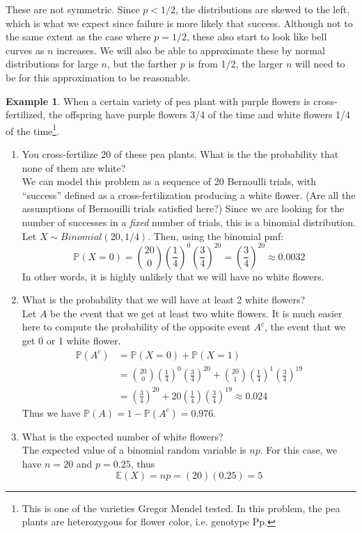 \documentclass[12pt]{article}
\theoremstyle{definition}
\newtheorem*{example}{Example}
\theoremstyle{remark}
\def\P{{\mathbb P}}
\def\E{{\mathbb E}}
\begin{document}
These are not symmetric. Since $p < 1/2$, the distributions are skewed to the left, which is what we expect since failure is more likely that success. Although not to the same extent as the case where $p = 1/2$, these also start to look like bell curves as $n$ increases. We will also be able to approximate these by normal distributions for large $n$, but the farther $p$ is from 1/2, the larger $n$ will need to be for this approximation to be reasonable.

\begin{example}When a certain variety of pea plant with purple flowers is cross-fertilized, the offspring have purple flowers 3/4 of the time and white flowers 1/4 of the time\footnote{This is one of the varieties Gregor Mendel tested. In this problem, the pea plants are heterozygous for flower color, i.e. genotype Pp.}. 
\begin{enumerate}
\item You cross-fertilize 20 of these pea plants. What is the the probability that none of them are white?\\

We can model this problem as a sequence of 20 Bernoulli trials, with ``success'' defined as a cross-fertilization producing a white flower. (Are all the assumptions of Bernouilli trials satisfied here?) Since we are looking for the number of successes in a \emph{fixed} number of trials, this is a binomial distribution. Let $X \sim Binomial(20, 1/4)$. Then, using the binomial pmf:
\[
\P(X = 0) = \binom{20}{0}\left(\frac{1}{4}\right)^0 \left(\frac{3}{4}\right)^{20} = \left(\frac{3}{4}\right)^{20} \approx 0.0032
\]
In other words, it is highly unlikely that we will have no white flowers.

\item What is the probability that we will have at least 2 white flowers?\\

Let $A$ be the event that we get at least two white flowers. It is much easier here to compute the probability of the opposite event $A^c$, the event that we get 0 or 1 white flower. 
\begin{align*}
\P(A^c) &= \P(X = 0) + \P(X = 1) \\
&= \binom{20}{0}\left(\frac{1}{4}\right)^0 \left(\frac{3}{4}\right)^{20} + \binom{20}{1}\left(\frac{1}{4}\right)^1 \left(\frac{3}{4}\right)^{19} \\
&= \left(\frac{3}{4}\right)^{20} + 20 \left(\frac{1}{4}\right) \left(\frac{3}{4}\right)^{19} \approx 0.024
\end{align*}
Thus we have $\P(A) = 1 - \P(A^c) = 0.976$.

\item What is the expected number of white flowers? \\

The expected value of a binomial random variable is $np$. For this case, we have $n = 20$ and $p = 0.25$, thus
\[
\E(X) = n p = (20)(0.25) = 5
\]
\end{enumerate} 
\end{example}
\end{document}
